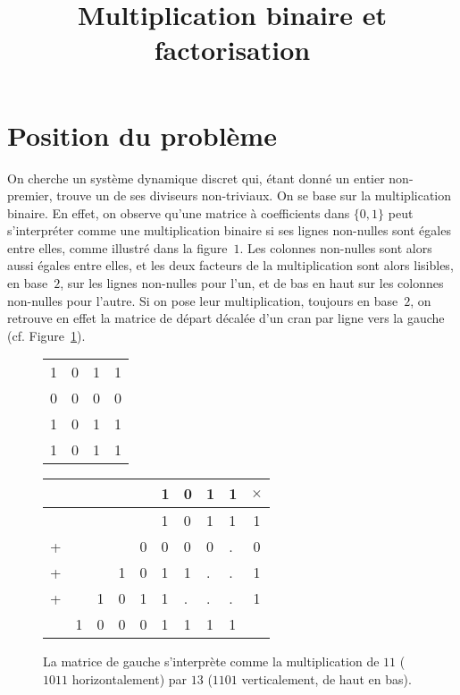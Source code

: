 \documentclass[11pt, openany, a4paper]{article}
\begin{document}
\renewcommand{\labelitemi}{$\bullet$}

\title{Multiplication binaire et factorisation}
\date{}
\author{}
\maketitle



\section{Position du problème}


On cherche un système dynamique discret qui, étant donné un entier non-premier, trouve un de ses diviseurs non-triviaux. On se base sur la multiplication binaire. En effet, on observe qu'une matrice à coefficients dans $\{0,1\}$ peut s'interpréter comme une multiplication binaire si ses lignes non-nulles sont égales entre elles, comme illustré dans la figure~$1$. Les colonnes non-nulles sont alors aussi égales entre elles, et les deux facteurs de la multiplication sont alors lisibles, en base~$2$, sur les lignes non-nulles pour l'un, et de bas en haut sur les colonnes non-nulles pour l'autre. Si on pose leur multiplication, toujours en base~$2$, on retrouve en effet la matrice de départ décalée d'un cran par ligne vers la gauche (cf. Figure~\ref{fig:ExShift}).




\begin{figure}[h]
\centering
\begin{minipage}[]{0.25\linewidth}

\begin{tabular}{cccc}
1&0&1&1\\
0&0&0&0\\
1&0&1&1\\
1&0&1&1\\
\end{tabular}

\end{minipage}
\quad
\begin{minipage}[]{0.4\linewidth}


\begin{tabular}{lllllllll|c}
&&&&&1&0&1&1&$\times$\\
\hline
&&&&&1&0&1&1&1\\
+&&&&0&0&0&0&.&0 \\
+&&&1&0&1&1&.&.&1\\
+&&1&0&1&1&.&.&.&1\\
\hline
&1&0&0&0&1&1&1&1&\\
\end{tabular}
\end{minipage}
\caption{La matrice de gauche s'interprète comme la multiplication de $11$ ($1011$ horizontalement) par $13$ ($1101$ verticalement, de haut en bas).}
\label{fig:ExShift}
\end{figure}
\end{document}
